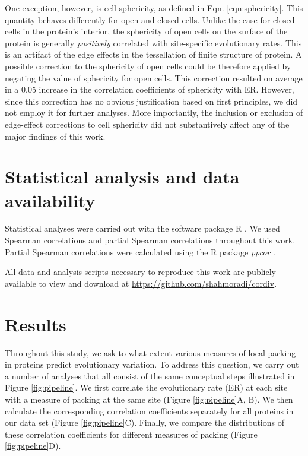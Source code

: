 \documentclass[12pt]{article}
\begin{document}
One exception, however, is cell sphericity, as defined in Eqn. \ref{eqn:sphericity}. This quantity behaves differently for open and closed cells. Unlike the case for closed cells in the protein's interior,  the sphericity of open cells on the surface of the protein is generally {\it positively} correlated with site-specific evolutionary rates. This is an artifact of the edge effects in the tessellation of finite structure of protein. A possible correction to the sphericity of open cells could be therefore applied by negating the value of sphericity for open cells. This correction resulted on average in a 0.05 increase in the correlation coefficients of sphericity with ER. However, since this correction has no obvious justification based on first principles, we did not employ it for further analyses. More importantly, the inclusion or exclusion of edge-effect corrections to cell sphericity did not substantively affect any of the major findings of this work.


\section*{Statistical analysis and data availability}  

Statistical analyses were carried out with the software package R \cite{ihaka1998r}. We used Spearman correlations and partial Spearman correlations throughout this work. Partial Spearman correlations were calculated using the R package {\it ppcor} \cite{kim_understanding_2006}.

All data and analysis scripts necessary to reproduce this work are publicly available to view and download at \url{https://github.com/shahmoradi/cordiv}.


\section*{Results}

Throughout this study, we ask to what extent various measures of local packing in proteins predict evolutionary variation. To address this question, we carry out a number of analyses that all consist of the same conceptual steps illustrated in Figure \ref{fig:pipeline}. We first correlate the evolutionary rate (ER) at each site with a measure of packing at the same site (Figure \ref{fig:pipeline}A, B). We then calculate the corresponding correlation coefficients separately for all proteins in our data set (Figure \ref{fig:pipeline}C). Finally, we compare the distributions of these correlation coefficients for different measures of packing (Figure \ref{fig:pipeline}D).
\end{document}
